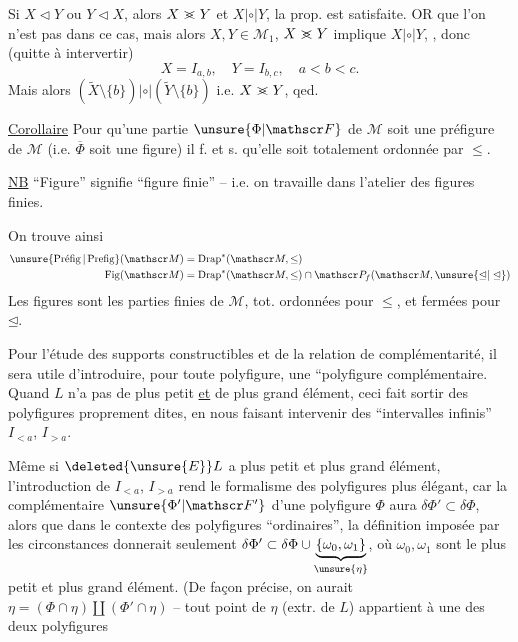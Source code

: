  Si $X\triangleleft Y$ ou $Y\triangleleft X$, alors $X\mathrel{>\mkern-12mu<}Y$ et $X|\circ|Y$, la prop. est satisfaite. OR   que l'on n'est pas dans ce cas, mais alors $X,Y\in\mathscr M_1$,   $X\mathrel{>\mkern-12mu<}Y$  implique $X|\circ|Y$, , donc (quitte à intervertir)
\[
X=I_{a,b},\quad Y=I_{b,c},\quad a<b<c.
\]
Mais alors $(\widetilde X\setminus\{b\})|\circ|(\widetilde Y\setminus\{b\})$ i.e. $X\mathrel{>\mkern-12mu<}Y$, qed.

\uline{Corollaire} Pour qu'une partie  $\unsure{\Phi|\mathscr F}$ de $\mathscr M$ soit une préfigure de $\mathscr M$ (i.e. $\overline\Phi$ soit une figure) il f. et s. qu'elle soit totalement ordonnée par $\leq$.


\uline{NB} ``Figure'' signifie ``figure finie'' -- i.e. on travaille dans l'atelier  des figures finies.

On trouve ainsi
\[
\begin{aligned}
\unsure{\operatorname{Pr\acute{e}fig}|\operatorname{Prefig}}(\mathscr M)&=\operatorname{Drap}^*(\mathscr M,\leq)\\
\operatorname{Fig}(\mathscr M)&=\operatorname{Drap}^*(\mathscr M,\leq)\cap\mathscr P_f(\mathscr M,\unsure{\unlhd|\trianglelefteq})
\end{aligned}
\]
Les figures sont les parties finies de $\mathscr M$, tot. ordonnées pour $\leq$, et fermées pour $\unlhd$.

Pour l'étude des supports constructibles et de la relation de complémentarité, il sera utile d'introduire, pour toute polyfigure, une ``polyfigure complémentaire. Quand $L$ n'a pas de plus petit \uline{et} de plus grand élément, ceci fait sortir des polyfigures proprement dites, en nous faisant intervenir des  ``intervalles infinis'' $I_{<a}$, $I_{>a}$.

Même si $\deleted{\unsure{E}}L$ a plus petit et plus grand élément, l'introduction de $I_{<a}$, $I_{>a}$ rend le formalisme des polyfigures plus élégant, car la complémentaire $\unsure{\Phi'|\mathscr F'}$ d'une polyfigure $\Phi$ aura $\delta\Phi'\subset\delta\Phi$, alors que  dans le contexte des polyfigures ``ordinaires'', la définition imposée par les circonstances donnerait seulement $\delta\Phi'\subset\delta\Phi\cup\underbrace{\{\omega_0,\omega_1\}}_{\unsure{\eta}}$, où $\omega_0,\omega_1$ sont le plus petit et plus grand élément. (De façon précise, on aurait $\eta=(\Phi\cap\eta)\amalg(\Phi'\cap\eta)$ -- tout point de $\eta$ (extr. de $L$) appartient à une des deux polyfigures

